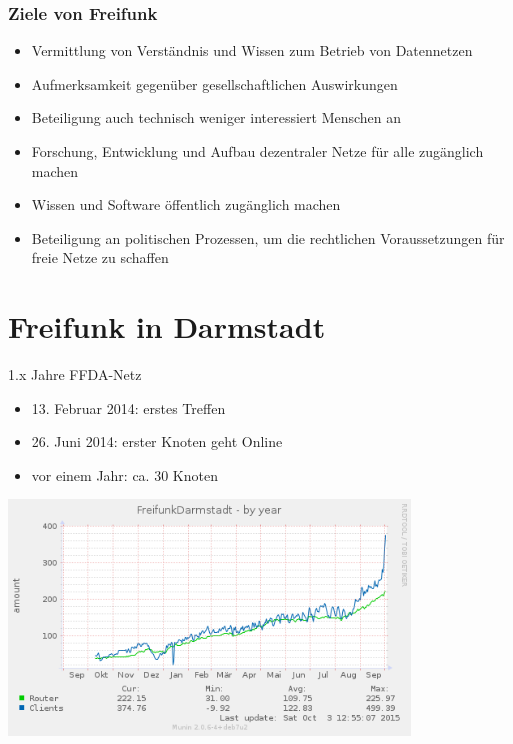 \documentclass[handout]{beamer}
\begin{document}
\begin{frame}
	\frametitle{Ziele von Freifunk}
	\begin{itemize}[<+->]
		\item Vermittlung von Verständnis und Wissen zum Betrieb von Datennetzen
		\item Aufmerksamkeit gegenüber gesellschaftlichen Auswirkungen
		\item Beteiligung auch technisch weniger interessiert Menschen an 
		\item Forschung, Entwicklung und Aufbau dezentraler Netze für alle zugänglich machen
		\item Wissen und Software öffentlich zugänglich machen
		\item Beteiligung an politischen Prozessen, um die rechtlichen Voraussetzungen für freie Netze zu schaffen
	\end{itemize}
\end{frame}


\section{Freifunk in Darmstadt}




\begin{frame}{1.x Jahre FFDA-Netz}
	\vfill
	\begin{itemize}[<+->]
		\item 13. Februar 2014: erstes Treffen
		\item 26. Juni 2014: erster Knoten geht Online
		\item vor einem Jahr: ca. 30 Knoten
	\end{itemize}
	\pause
	\begin{center}
		\includegraphics[width=0.8\textwidth]{images/ffda-Okt14-15}
	\end{center}
\end{frame}
\end{document}
